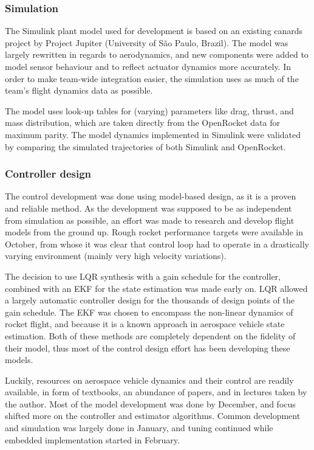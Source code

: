 \subsubsection*{Simulation}
The Simulink plant model used for development is based on an existing canards project by Project Jupiter (University of São Paulo, Brazil). 
The model was largely rewritten in regards to aerodynamics, and new components were added to model sensor behaviour and to reflect actuator dynamics more accurately. 
In order to make team-wide integration easier, the simulation uses as much of the team's flight dynamics data as possible.

The model uses look-up tables for (varying) parameters like drag, thrust, and mass distribution, which are taken directly from the OpenRocket data for maximum parity. 
The model dynamics implemented in Simulink were validated by comparing the simulated trajectories of both Simulink and OpenRocket.

\subsubsection*{Controller design}

The control development was done using model-based design, as it is a proven and reliable method.
As the development was supposed to be as independent from simulation as possible, an effort was made to research and develop flight models from the ground up.
Rough rocket performance targets were available in October, from whose it was clear that control loop had to operate in a drastically varying environment (mainly very high velocity variations).

The decision to use LQR synthesis with a gain schedule for the controller, combined with an EKF for the state estimation was made early on.
LQR allowed a largely automatic controller design for the thousands of design points of the gain schedule.
The EKF was chosen to encompass the non-linear dynamics of rocket flight, and because it is a known approach in aerospace vehicle state estimation.
Both of these methods are completely dependent on the fidelity of their model, thus most of the control design effort has been developing these models.

Luckily, resources on aerospace vehicle dynamics and their control are readily available, in form of textbooks, an abundance of papers, and in lectures taken by the author.
Most of the model development was done by December, and focus shifted more on the controller and estimator algorithms. 
Common development and simulation was largely done in January, and tuning continued while embedded implementation started in February.
